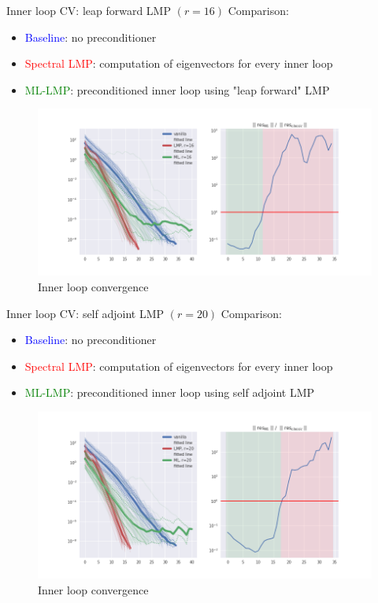 \documentclass[10pt,aspectratio=169]{beamer}
\begin{document}
\begin{frame}{Inner loop CV: leap forward LMP $(r=16)$}
Comparison:
\begin{itemize}
    \item \textcolor{blue}{Baseline}: no preconditioner
    \item \textcolor{red}{Spectral LMP}: computation of eigenvectors for every inner loop
    \item \textcolor{green}{ML-LMP}: preconditioned inner loop using "leap forward" LMP
\end{itemize}
\begin{centering}
\begin{figure}
    \centering
    \includegraphics[width=.7\linewidth]{img/40-inv-rank-16-white-cottage_rate_cv_inner_loop.png}
    \caption{Inner loop convergence}
    \label{fig:inner_loop_cv2}
\end{figure}   
\end{centering}
\end{frame}
\begin{frame}{Inner loop CV: self adjoint LMP $(r=20)$}
Comparison:
\begin{itemize}
    \item \textcolor{blue}{Baseline}: no preconditioner
    \item \textcolor{red}{Spectral LMP}: computation of eigenvectors for every inner loop
    \item \textcolor{green}{ML-LMP}: preconditioned inner loop using self adjoint LMP
\end{itemize}
\begin{centering}
\begin{figure}
    \centering
    \includegraphics[width=.7\linewidth]{img/40-inv-rank-20-absolute-doorjamb_rate_cv_inner_loop.png}
    \caption{Inner loop convergence}
    \label{fig:inner_loop_cv3}
\end{figure}   
\end{centering}
\end{frame}
\end{document}
